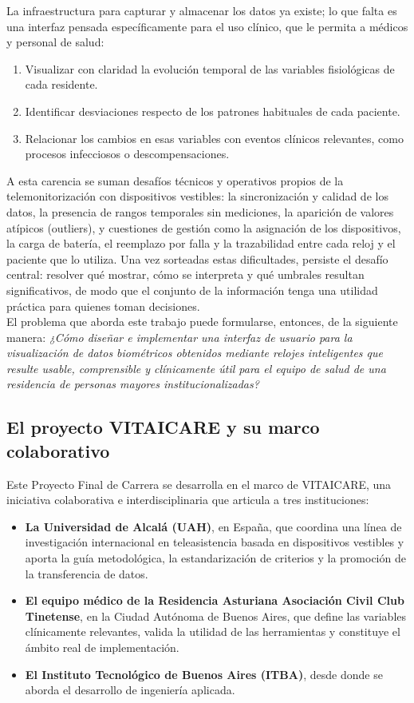 \documentclass[12pt,a4paper]{article}
\begin{document}
    La infraestructura para capturar y almacenar los datos ya existe; lo que falta es una interfaz pensada específicamente para el uso clínico, que le permita a médicos y personal de salud:
    \begin{enumerate}
        \item Visualizar con claridad la evolución temporal de las variables fisiológicas de cada residente.
        \item Identificar desviaciones respecto de los patrones habituales de cada paciente.
        \item Relacionar los cambios en esas variables con eventos clínicos relevantes, como procesos infecciosos o descompensaciones.       
    \end{enumerate}
    A esta carencia se suman desafíos técnicos y operativos propios de la telemonitorización con dispositivos vestibles: la sincronización y calidad de los datos, la presencia de rangos temporales sin mediciones, la aparición de valores atípicos (outliers), y cuestiones de gestión como la asignación de los dispositivos, la carga de batería, el reemplazo por falla y la trazabilidad entre cada reloj y el paciente que lo utiliza. Una vez sorteadas estas dificultades, persiste el desafío central: resolver qué mostrar, cómo se interpreta y qué umbrales resultan significativos, de modo que el conjunto de la información tenga una utilidad práctica para quienes toman decisiones.\\
    El problema que aborda este trabajo puede formularse, entonces, de la siguiente manera:
    \textit{¿Cómo diseñar e implementar una interfaz de usuario para la visualización de datos biométricos obtenidos mediante relojes inteligentes que resulte usable, comprensible y clínicamente útil para el equipo de salud de una residencia de personas mayores institucionalizadas?}
    
    \subsection{El proyecto VITAICARE y su marco colaborativo}
    Este Proyecto Final de Carrera se desarrolla en el marco de VITAICARE, una iniciativa colaborativa e interdisciplinaria que articula a tres instituciones:
    \begin{itemize}
        \item \textbf{La Universidad de Alcalá (UAH)}, en España, que coordina una línea de investigación internacional en teleasistencia basada en dispositivos vestibles y aporta la guía metodológica, la estandarización de criterios y la promoción de la transferencia de datos.
        \item \textbf{El equipo médico de la Residencia Asturiana Asociación Civil Club Tinetense}, en la Ciudad Autónoma de Buenos Aires, que define las variables clínicamente relevantes, valida la utilidad de las herramientas y constituye el ámbito real de implementación.
        \item \textbf{El Instituto Tecnológico de Buenos Aires (ITBA)}, desde donde se aborda el desarrollo de ingeniería aplicada.
    \end{itemize}
\end{document}
